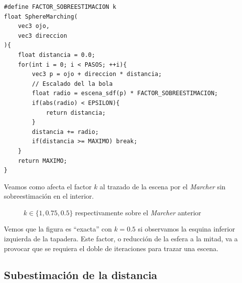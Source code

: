 \begin{lstlisting}
#define FACTOR_SOBREESTIMACION k
float SphereMarching(
    vec3 ojo, 
    vec3 direccion
){
    float distancia = 0.0;
    for(int i = 0; i < PASOS; ++i){
        vec3 p = ojo + direccion * distancia;
        // Escalado del la bola
        float radio = escena_sdf(p) * FACTOR_SOBREESTIMACION;
        if(abs(radio) < EPSILON){
            return distancia;
        }
        distancia += radio;
        if(distancia >= MAXIMO) break;
    }
    return MAXIMO;
}
\end{lstlisting}
Veamos como afecta el factor \(k\) al trazado de la escena por el \textit{Marcher} sin sobreestimación en el interior.

\begin{figure}[H]
  \centering
  \captionsetup{justification=centering}%
  \hfill
  \hfill
  \caption{\(k\in\{1, 0.75, 0.5\}\) respectivamente sobre el \textit{Marcher} anterior}
\end{figure}

Vemos que la figura es \enquote{exacta} con \(k=0.5\) si observamos la esquina inferior izquierda de la tapadera. Este factor, o reducción de la esfera a la mitad, va a provocar que se requiera el doble de iteraciones para trazar una escena.

\subsection{Subestimación de la distancia}

